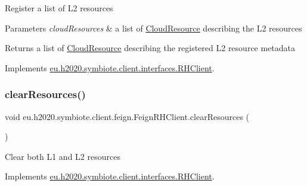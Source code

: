 Register a list of L2 resources


\begin{DoxyParams}{Parameters}
{\em cloud\+Resources} & a list of \hyperlink{}{Cloud\+Resource} describing the L2 resources \\
\hline
\end{DoxyParams}
\begin{DoxyReturn}{Returns}
a list of \hyperlink{}{Cloud\+Resource} describing the registered L2 resource metadata 
\end{DoxyReturn}


Implements \hyperlink{interfaceeu_1_1h2020_1_1symbiote_1_1client_1_1interfaces_1_1RHClient_a456f65eb2b4db26964617571d617b2ba}{eu.\+h2020.\+symbiote.\+client.\+interfaces.\+R\+H\+Client}.

\mbox{\label{classeu_1_1h2020_1_1symbiote_1_1client_1_1feign_1_1FeignRHClient_adff80519c8c1228b16677a7ea1112079}} 
\subsubsection{\texorpdfstring{clear\+Resources()}{clearResources()}}
{\footnotesize\ttfamily void eu.\+h2020.\+symbiote.\+client.\+feign.\+Feign\+R\+H\+Client.\+clear\+Resources (\begin{DoxyParamCaption}{ }\end{DoxyParamCaption})}

Clear both L1 and L2 resources 

Implements \hyperlink{interfaceeu_1_1h2020_1_1symbiote_1_1client_1_1interfaces_1_1RHClient_a24f46b3db8f8e4050885bb6cc6b03127}{eu.\+h2020.\+symbiote.\+client.\+interfaces.\+R\+H\+Client}.

\mbox{\label{classeu_1_1h2020_1_1symbiote_1_1client_1_1feign_1_1FeignRHClient_aef7c169c970267f47e7c56812c9a7422}} 
